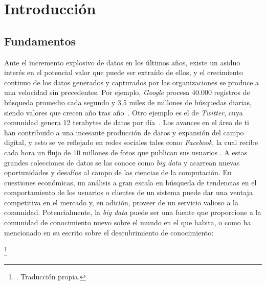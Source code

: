 \chapter{Introducción}
\label{chapter:introduccion}

\section{Fundamentos}

Ante el incremento explosivo de datos en los últimos años, existe un asiduo
interés en el potencial valor que puede ser extraído de ellos, y el crecimiento
continuo de los datos generados y capturados por las organizaciones se produce a
una velocidad sin precedentes. Por ejemplo, \textit{Google} procesa 40.000
registros de búsqueda promedio cada segundo y 3.5 miles de millones de búsquedas
diarias, siendo valores que crecen año tras año~\cite{noauthor_google_nodate}.
Otro ejemplo es el de \textit{Twitter}, cuya comunidad genera 12 terabytes de
datos por día~\cite{sehgal_sentiment_2016}. Los avances en el área de
\acrfull{ti} han contribuido a una incesante producción de datos y expansión del
campo digital, y esto se ve reflejado en redes sociales tales como
\textit{Facebook}, la cual recibe cada hora un flujo de 10 millones de fotos que
publican sus usuarios \cite{mayer-schonberger_big_2013}. A estas grandes
colecciones de datos se las conoce como \textit{big data} y acarrean nuevas
oportunidades y desafíos al campo de las ciencias de la computación. En
cuestiones económicas, un análisis a gran escala en búsqueda de tendencias en el
comportamiento de los usuarios o clientes de un sistema puede dar una ventaja
competitiva en el mercado y, en adición, proveer de un servicio valioso a la
comunidad. Potencialmente, la \textit{big data} puede ser una fuente que
proporcione a la comunidad de conocimiento nuevo sobre el mundo en el que
habita, o como ha mencionado \citeauthor{fayyad_advances_1996} en su escrito
sobre el descubrimiento de conocimiento:

\begin{displayquote}
	\footnote{ \cite[p. 2]{fayyad_advances_1996}. Traducción propia.}
\end{displayquote}

